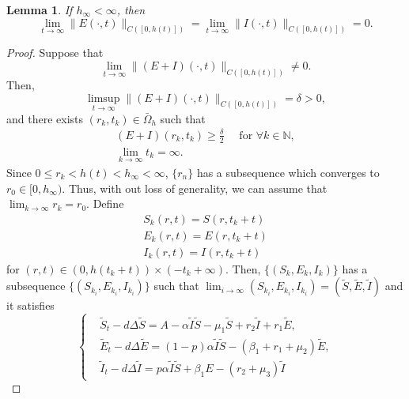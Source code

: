\documentclass[11pt]{amsart}
\numberwithin{equation}{section}
\theoremstyle{plain}
\newtheorem{lemma}[theorem]{Lemma}
\theoremstyle{definition}
\begin{document}
\begin{lemma} \label{lemma 4.5}
If $h_\infty < \infty$, then
\begin{equation*}
	\lim_{t \to \infty}\lVert E(\cdot ,t)\rVert_{C([0,h(t)])}=\lim_{t \to \infty}\lVert I(\cdot ,t)\rVert_{C([0,h(t)])}=0.
\end{equation*}
\end{lemma}
\begin{proof}
	Suppose that
	\begin{equation*}
		\lim_{t\to \infty}\lVert (E+I)(\cdot,t)\rVert_{C([0,h(t)])}\neq 0. 
	\end{equation*}
	Then, 
	\begin{equation*}
		\limsup_{t \to \infty}\lVert (E + I) (\cdot , t)\rVert_{C([0,h(t)])}=\delta>0,
	\end{equation*}
	 and there exists $(r_k,t_k)\in \bar \Omega_h$ such that
	\begin{equation*}
	\begin{gathered}
		 (E+I)(r_k,t_k)\geq \frac{\delta}{2} \quad\text{ for }\forall k\in \mathbb{N},\\
		\lim_{k \to \infty}t_k= \infty.
	\end{gathered}
	\end{equation*}
	Since $0 \leq r_k < h(t) < h_\infty < \infty$, $\{r_n\}$ has a subsequence which converges to $r_0\in [0,h_\infty)$. Thus, with out loss of generality, we can assume that $\displaystyle\lim_{k\to \infty}r_k=r_0$. Define
	\begin{equation*}
		\begin{aligned}
			S_k(r,t)=S(r,t_k+t)\\
			E_k(r,t)=E(r,t_k+t)\\
			I_k(r,t)=I(r,t_k+t)
		\end{aligned}
	\end{equation*}
	for $(r,t) \in (0,h(t_k+t))\times (-t_k+\infty)$. Then, $\{(S_k,E_k,I_k)\}$ has a subsequence $\{(S_{k_i},E_{k_i},I_{k_i})\}$ such that $\displaystyle \lim_{i \to \infty}(S_{k_i},E_{k_i},I_{k_i})=(\tilde S,\tilde E,\tilde I)$ and it satisfies
	\begin{equation*}
		\left \{ \begin{aligned}
			&\tilde S_t-d\Delta \tilde S = A - \alpha \tilde I \tilde S -\mu_1 \tilde S+r_2\tilde I+r_1\tilde E,\\
			&\tilde E_t-d\Delta \tilde E=(1-p)\alpha \tilde I \tilde S -(\beta_1+r_1+\mu_2)\tilde E,\\
			&\tilde I_t-d\Delta \tilde I =p\alpha \tilde I \tilde S +\beta_1 E-(r_2+\mu_3)\tilde I

\end{aligned}
\end{equation*}
\end{proof}
\end{document}
